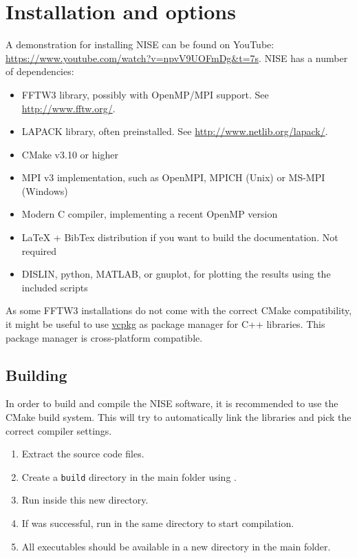 \chapter{Installation and options}
A demonstration for installing NISE can be found on YouTube: \url{https://www.youtube.com/watch?v=npvV9UOFmDg&t=7s}.
NISE has a number of dependencies:
\begin{itemize}
\item FFTW3 library, possibly with OpenMP/MPI support. See \url{http://www.fftw.org/}.
\item LAPACK library, often preinstalled. See \url{http://www.netlib.org/lapack/}.
\item CMake v3.10 or higher
\item MPI v3 implementation, such as OpenMPI, MPICH (Unix) or MS-MPI (Windows)
\item Modern C compiler, implementing a recent OpenMP version
\item LaTeX + BibTex distribution if you want to build the documentation. Not required
\item DISLIN, python, MATLAB, or gnuplot, for plotting the results using the included scripts
\end{itemize}
As some FFTW3 installations do not come with the correct CMake compatibility, it might be useful to use \href{https://github.com/microsoft/vcpkg}{vcpkg} as package manager for C++ libraries. This package manager is cross-platform compatible.

\section{Building}
In order to build and compile the NISE software, it is recommended to use the CMake build system. This will try to automatically link the libraries and pick the correct compiler settings.
\begin{enumerate}
\item Extract the source code files.
\item Create a \texttt{build} directory in the main folder using .
\item Run  inside this new  directory.
\item If  was successful, run  in the same directory to start compilation.
\item All executables should be available in a new  directory in the main folder.
\end{enumerate}


